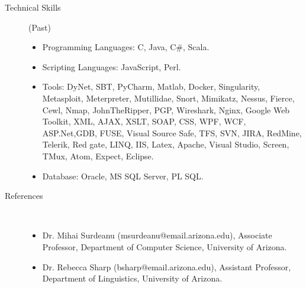 \documentclass[10pt]{article}
\begin{document}
\begin{description}
\item [Technical Skills] (Past) \
\begin{itemize}
\itemsep0em
\item Programming Languages:  C, Java, C\#, Scala.
\item Scripting Languages: JavaScript, Perl.
\item Tools: DyNet, SBT, PyCharm, Matlab, Docker, Singularity, Metasploit, Meterpreter, Mutillidae, Snort, Mimikatz, Nessus, Fierce, Cewl, Nmap, JohnTheRipper, PGP, Wireshark, Nginx, Google Web Toolkit, XML, AJAX, XSLT, SOAP, CSS, WPF, WCF, ASP.Net,GDB, FUSE, Visual Source Safe, TFS, SVN, JIRA, RedMine, Telerik, Red gate, LINQ, IIS, Latex, Apache, Visual Studio, Screen, TMux, Atom, Expect, Eclipse.
\item Database: Oracle, MS SQL Server, PL SQL.\\
\end{itemize}
\item [References]  \
\begin{itemize}
\itemsep0em
\item Dr. Mihai Surdeanu (msurdeanu@email.arizona.edu), Associate Professor, Department of Computer Science, University of Arizona.
\item Dr. Rebecca Sharp (bsharp@email.arizona.edu), Assistant Professor, Department of Linguistics, University of Arizona.
\end{itemize}

\end{description}
\end{document}
